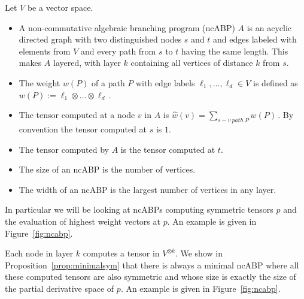 \begin{definition}\label{def:ncabp}
    Let $V$ be a vector space.
    \begin{itemize}
        \item
            A non-commutative algebraic branching program (ncABP) $A$ is an acyclic directed graph with two distinguished nodes $s$ and $t$ and edges labeled with elements from $V$ and every path from $s$ to $t$ having the same length.
            This makes $A$ layered, with layer $k$ containing all vertices of distance $k$ from $s$.
        \item
            The weight $w(P)$ of a path $P$ with edge labels $\ell_1, \ldots, \ell_d \in V$ is defined as
            $
                w(P) := \ell_1 \otimes \dots \otimes \ell_d\,.
            $
        \item
            The tensor computed at a node $v$ in $A$ is
            $
                \hat{w}(v) = \sum_{s-v\ path\ P}w(P)\,.
            $
            By convention the tensor computed at $s$ is $1$.
        \item
            The tensor computed by $A$ is the tensor computed at $t$.
        \item
            The size of an ncABP is the number of vertices.
        \item
            The width of an ncABP is the largest number of vertices in any layer.
    \end{itemize}
\end{definition}
In particular we will be looking at ncABPs computing symmetric tensors $p$ and the evaluation of highest weight vectors at $p$.
An example is given in Figure~\ref{fig:ncabp}.

Each node in layer $k$ computes a tensor in $V^{\otimes k}$.
We show in Proposition~\ref{prop:minimalsym} that there is always a minimal ncABP where all these computed tensors are also symmetric and whose size is exactly the size of the partial derivative space of $p$.
An example is given in Figure~\ref{fig:ncabp}.

